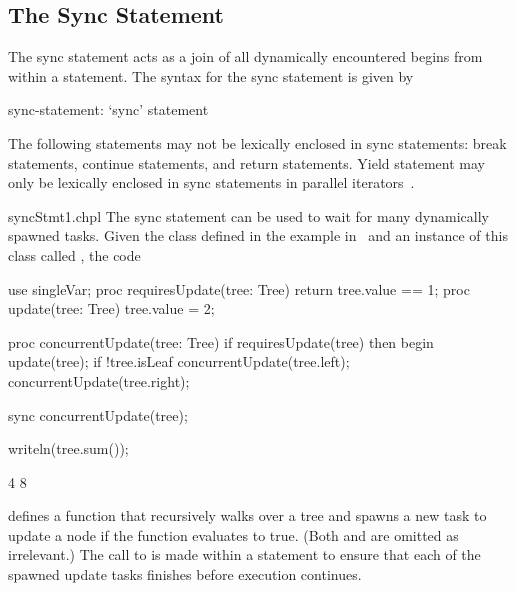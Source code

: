 \subsection{The Sync Statement}
\label{Sync_Statement}

The sync statement acts as a join of all dynamically encountered
begins from within a statement.  The syntax for the sync statement is
given by
\begin{syntax}
sync-statement:
  `sync' statement
\end{syntax}
The following statements may not be lexically enclosed in
sync statements: break statements, continue statements, and
return statements.  Yield statement may only be lexically enclosed in
sync statements in parallel iterators~.

\begin{chapelexample}{syncStmt1.chpl}
The sync statement can be used to wait for many dynamically spawned
tasks.  Given the  class defined in the example
in~ and an instance of this class
called , the code
\begin{chapelpre}
use singleVar;
proc requiresUpdate(tree: Tree) {
  return tree.value == 1;
}
proc update(tree: Tree) {
  tree.value = 2;
}
\end{chapelpre}
\begin{chapel}
proc concurrentUpdate(tree: Tree) {
  if requiresUpdate(tree) then
    begin update(tree);
  if !tree.isLeaf {
    concurrentUpdate(tree.left);
    concurrentUpdate(tree.right);
  }
}

sync concurrentUpdate(tree);
\end{chapel}
\begin{chapelpost}
writeln(tree.sum());
\end{chapelpost}
\begin{chapeloutput}
4
8
\end{chapeloutput}
defines a function  that recursively walks over
a tree and spawns a new task to update a node if the
function  evaluates to true.
(Both  and  are omitted as
irrelevant.)  The call to  is made within
a  statement to ensure that each of the spawned update
tasks finishes before execution continues.
\end{chapelexample}

